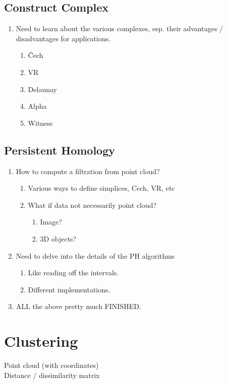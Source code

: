 \documentclass[10pt,a4paper]{article}
\begin{document}
\subsection{Construct Complex}
\begin{enumerate}
	\item Need to learn about the various complexes, esp. their advantages / disadvantages for applications.
	\begin{enumerate}
		\item \v Cech
		\item VR
		\item Delaunay
		\item Alpha
		\item Witness
	\end{enumerate}
\end{enumerate}
\subsection{Persistent Homology}
\begin{enumerate}
	\item How to compute a filtration from point cloud?
	\begin{enumerate}
		\item Various ways to define simplices, Cech, VR, etc
		\item What if data not necessarily point cloud?
		\begin{enumerate}
			\item Image?
			\item 3D objects?
		\end{enumerate}
	\end{enumerate}
	\item Need to delve into the details of the PH algorithms
	\begin{enumerate}
		\item Like reading off the intervals.
		\item Different implementations.
	\end{enumerate}
	\item ALL the above pretty much FINISHED.
\end{enumerate}

\section{Clustering}
Point cloud (with coordinates)\\

Distance / dissimilarity matrix\\
\end{document}
